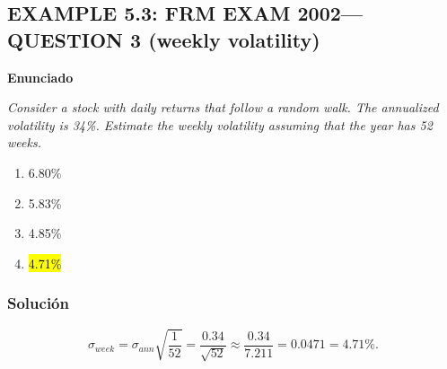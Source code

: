 ﻿\subsection{EXAMPLE 5.3: FRM EXAM 2002---QUESTION 3 (weekly volatility)}

\textbf{Enunciado}

\emph{Consider a stock with daily returns that follow a random walk. The annualized volatility is 34\%. Estimate the weekly volatility assuming that the year has 52 weeks.}
\begin{enumerate}[label=\alph*.]
\item 6.80\%
\item 5.83\%
\item 4.85\%
\item \hl{4.71\%}
\end{enumerate}

\subsubsection*{Solución}


\[
\sigma_{week}=\sigma_{ann}\sqrt{\frac{1}{52}}=\frac{0.34}{\sqrt{52}}
\approx \frac{0.34}{7.211}=0.0471=4.71\%.
\]











